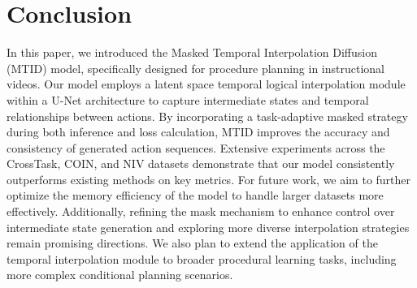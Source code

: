 \section{Conclusion}
In this paper, we introduced the Masked Temporal Interpolation Diffusion (MTID) model, specifically designed for procedure planning in instructional videos. Our model employs a latent space temporal logical interpolation module within a U-Net architecture to capture intermediate states and temporal relationships between actions. By incorporating a task-adaptive masked strategy during both inference and loss calculation, MTID improves the accuracy and consistency of generated action sequences. Extensive experiments across the CrossTask, COIN, and NIV datasets demonstrate that our model consistently outperforms existing methods on key metrics.
For future work, we aim to further optimize the memory efficiency of the model to handle larger datasets more effectively. Additionally, refining the mask mechanism to enhance control over intermediate state generation and exploring more diverse interpolation strategies remain promising directions. We also plan to extend the application of the temporal interpolation module to broader procedural learning tasks, including more complex conditional planning scenarios.






